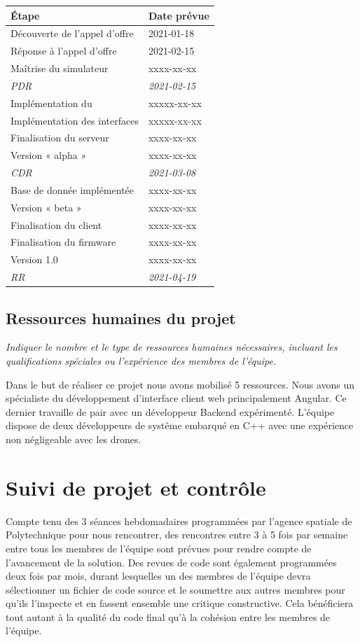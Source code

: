 \documentclass{mistcoursedoc}
\begin{document}
\begin{table}[h!]
    \centering
    \begin{tabular}{M{7cm} M{4cm}}
      \hline
      \textbf{Étape} & \textbf{Date prévue} \tabularnewline
      \hline
      Découverte de l'appel d'offre & 2021-01-18 \tabularnewline
      Réponse à l'appel d'offre & 2021-02-15 \tabularnewline
      Maîtrise du simulateur & xxxx-xx-xx \tabularnewline
      \textit{PDR} &  \textit{2021-02-15} \tabularnewline
      Implémentation du  & xxxxx-xx-xx \tabularnewline
      Implémentation des interfaces & xxxxx-xx-xx \tabularnewline
      Finalisation du serveur & xxxx-xx-xx \tabularnewline
      Version « alpha » & xxxx-xx-xx \tabularnewline
      \textit{CDR} & \textit{2021-03-08} \tabularnewline
      Base de donnée implémentée & xxxx-xx-xx \tabularnewline
      Version « beta » & xxxx-xx-xx \tabularnewline
      Finalisation du client & xxxx-xx-xx \tabularnewline
      Finalisation du firmware & xxxx-xx-xx \tabularnewline
      Version 1.0 & xxxx-xx-xx \tabularnewline
      \textit{RR} &  \textit{2021-04-19} \tabularnewline
      \hline
    \end{tabular}
\end{table}

\subsection{Ressources humaines du projet}

\textit{Indiquer le nombre et le type de ressources humaines nécessaires, incluant les qualifications spéciales ou l’expérience des membres de l’équipe.}

\par Dans le but de réaliser ce projet nous avons mobilisé 5 ressources. 
 Nous avons un spécialiste du développement d'interface client web principalement Angular. Ce dernier travaille de pair avec un développeur Backend expérimenté. 
 L'équipe dispose de deux développeurs de systême embarqué en C++ avec une expérience non négligeable avec les drones. 

\section{Suivi de projet et contrôle}

Compte tenu des 3 séances hebdomadaires programmées par l'agence spatiale de Polytechnique pour nous rencontrer, des rencontres entre 3 à 5 fois par semaine entre tous les membres de l'équipe sont prévues pour rendre compte de l'avancement de la solution. Des revues de code sont également programmées deux fois par mois, durant lesquelles un des membres de l'équipe devra sélectionner un fichier de code source et le soumettre aux autres membres pour qu'ils l'inspecte et en fassent ensemble une critique constructive. Cela bénéficiera tout autant à la qualité du code final qu'à la cohésion entre les membres de l'équipe.
\end{document}
